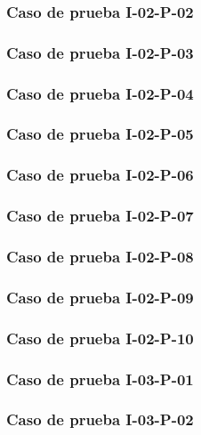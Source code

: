 \documentclass[10pt,a4paper]{article}
\begin{document}
			\subsubsection{Caso de prueba I-02-P-02}

			\subsubsection{Caso de prueba I-02-P-03}

			\subsubsection{Caso de prueba I-02-P-04}

			\subsubsection{Caso de prueba I-02-P-05}

			\subsubsection{Caso de prueba I-02-P-06}

			\subsubsection{Caso de prueba I-02-P-07}

			\subsubsection{Caso de prueba I-02-P-08}

			\subsubsection{Caso de prueba I-02-P-09}

			\subsubsection{Caso de prueba I-02-P-10}

			\subsubsection{Caso de prueba I-03-P-01}

			\subsubsection{Caso de prueba I-03-P-02}
\end{document}
